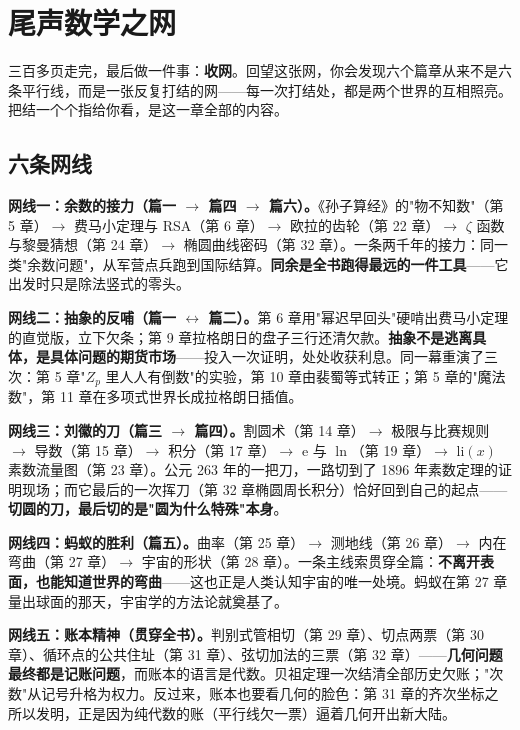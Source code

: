 \chapter*{尾声\quad 数学之网}

三百多页走完，最后做一件事：\textbf{收网}。回望这张网，你会发现六个篇章从来不是六条平行线，而是一张反复打结的网——每一次打结处，都是两个世界的互相照亮。把结一个个指给你看，是这一章全部的内容。

\section*{六条网线}

\textbf{网线一：余数的接力（篇一 $\to$ 篇四 $\to$ 篇六）。}《孙子算经》的"物不知数"（第 5 章）$\to$ 费马小定理与 RSA（第 6 章）$\to$ 欧拉的齿轮（第 22 章）$\to$ $\zeta$ 函数与黎曼猜想（第 24 章）$\to$ 椭圆曲线密码（第 32 章）。一条两千年的接力：同一类"余数问题"，从军营点兵跑到国际结算。\textbf{同余是全书跑得最远的一件工具}——它出发时只是除法竖式的零头。

\textbf{网线二：抽象的反哺（篇一 $\leftrightarrow$ 篇二）。}第 6 章用"幂迟早回头"硬啃出费马小定理的直觉版，立下欠条；第 9 章拉格朗日的盘子三行还清欠款。\textbf{抽象不是逃离具体，是具体问题的期货市场}——投入一次证明，处处收获利息。同一幕重演了三次：第 5 章"$Z_p$ 里人人有倒数"的实验，第 10 章由裴蜀等式转正；第 5 章的"魔法数"，第 11 章在多项式世界长成拉格朗日插值。

\textbf{网线三：刘徽的刀（篇三 $\to$ 篇四）。}割圆术（第 14 章）$\to$ 极限与比赛规则 $\to$ 导数（第 15 章）$\to$ 积分（第 17 章）$\to$ $\mathrm{e}$ 与 $\ln$（第 19 章）$\to$ $\mathrm{li}(x)$ 素数流量图（第 23 章）。公元 263 年的一把刀，一路切到了 1896 年素数定理的证明现场；而它最后的一次挥刀（第 32 章椭圆周长积分）恰好回到自己的起点——\textbf{切圆的刀，最后切的是"圆为什么特殊"本身}。

\textbf{网线四：蚂蚁的胜利（篇五）。}曲率（第 25 章）$\to$ 测地线（第 26 章）$\to$ 内在弯曲（第 27 章）$\to$ 宇宙的形状（第 28 章）。一条主线索贯穿全篇：\textbf{不离开表面，也能知道世界的弯曲}——这也正是人类认知宇宙的唯一处境。蚂蚁在第 27 章量出球面的那天，宇宙学的方法论就奠基了。

\textbf{网线五：账本精神（贯穿全书）。}判别式管相切（第 29 章）、切点两票（第 30 章）、循环点的公共住址（第 31 章）、弦切加法的三票（第 32 章）——\textbf{几何问题最终都是记账问题}，而账本的语言是代数。贝祖定理一次结清全部历史欠账；"次数"从记号升格为权力。反过来，账本也要看几何的脸色：第 31 章的齐次坐标之所以发明，正是因为纯代数的账（平行线欠一票）逼着几何开出新大陆。

